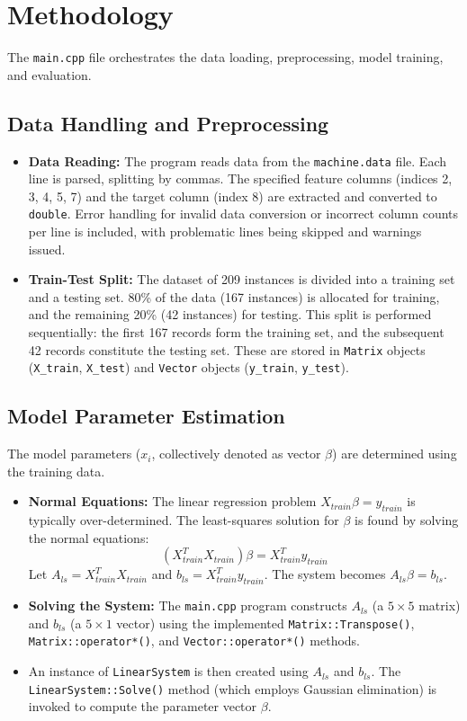 \section{Methodology}
\label{sec:methodology_partb}
The \texttt{main.cpp} file orchestrates the data loading, preprocessing, model training, and evaluation.

\subsection{Data Handling and Preprocessing}
\begin{itemize}
    \item \textbf{Data Reading:} The program reads data from the \texttt{machine.data} file. Each line is parsed, splitting by commas. The specified feature columns (indices 2, 3, 4, 5, 7) and the target column (index 8) are extracted and converted to \texttt{double}. Error handling for invalid data conversion or incorrect column counts per line is included, with problematic lines being skipped and warnings issued.
    \item \textbf{Train-Test Split:} The dataset of 209 instances is divided into a training set and a testing set. 80\% of the data (167 instances) is allocated for training, and the remaining 20\% (42 instances) for testing. This split is performed sequentially: the first 167 records form the training set, and the subsequent 42 records constitute the testing set. These are stored in \texttt{Matrix} objects (\texttt{X\_train}, \texttt{X\_test}) and \texttt{Vector} objects (\texttt{y\_train}, \texttt{y\_test}).
\end{itemize}

\subsection{Model Parameter Estimation}
The model parameters ($x_i$, collectively denoted as vector $\beta$) are determined using the training data.
\begin{sloppypar}
\begin{itemize}
    \item \textbf{Normal Equations:} The linear regression problem $X_{train}\beta = y_{train}$ is typically over-determined. The least-squares solution for $\beta$ is found by solving the normal equations:
    $$ (X_{train}^T X_{train}) \beta = X_{train}^T y_{train} $$
    Let $A_{ls} = X_{train}^T X_{train}$ and $b_{ls} = X_{train}^T y_{train}$. The system becomes $A_{ls}\beta = b_{ls}$.
    \item \textbf{Solving the System:} The \texttt{main.cpp} program constructs $A_{ls}$ (a $5 \times 5$ matrix) and $b_{ls}$ (a $5 \times 1$ vector) using the implemented \texttt{Matrix::Transpose()}, \texttt{Matrix::operator*()}, and \texttt{Vector::operator*()} methods.
    \item An instance of \texttt{LinearSystem} is then created using $A_{ls}$ and $b_{ls}$. The \texttt{LinearSystem::Solve()} method (which employs Gaussian elimination) is invoked to compute the parameter vector $\beta$.
\end{itemize}
\end{sloppypar}

